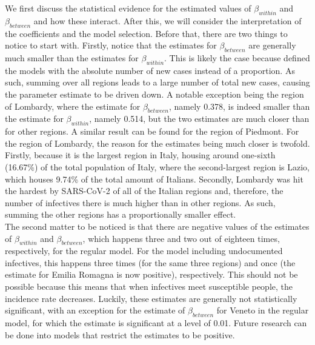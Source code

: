 \documentclass[12pt]{article}
\begin{document}
	We first discuss the statistical evidence for the estimated values of $\beta_{within}$ and $\beta_{between}$ and how these interact. After this, we will consider the interpretation of the coefficients and the model selection. Before that, there are two things to notice to start with. Firstly, notice that the estimates for $\beta_{between}$ are generally much smaller than the estimates for $\beta_{within}$. This is likely the case because \textcite{adda2016economic} defined the models with the absolute number of new cases instead of a proportion. As such, summing over all regions leads to a large number of total new cases, causing the parameter estimate to be driven down. A notable exception being the region of Lombardy, where the estimate for $\beta_{between}$, namely 0.378, is indeed smaller than the estimate for $\beta_{within}$, namely 0.514, but the two estimates are much closer than for other regions. A similar result can be found for the region of Piedmont. For the region of Lombardy, the reason for the estimates being much closer is twofold. Firstly, because it is the largest region in Italy, housing around one-sixth (16.67\%) of the total population of Italy, where the second-largest region is Lazio, which houses 9.74\% of the total amount of Italians. Secondly, Lombardy was hit the hardest by SARS-CoV-2 of all of the Italian regions and, therefore, the number of infectives there is much higher than in other regions. As such, summing the other regions has a proportionally smaller effect. \\
	
	The second matter to be noticed is that there are negative values of the estimates of $\beta_{within}$ and $\beta_{between}$, which happens three and two out of eighteen times, respectively, for the regular model. For the model including undocumented infectives, this happens three times (for the same three regions) and once (the estimate for Emilia Romagna is now positive), respectively. This should not be possible because this means that when infectives meet susceptible people, the incidence rate decreases. Luckily, these estimates are generally not statistically significant, with an exception for the estimate of $\beta_{between}$ for Veneto in the regular model, for which the estimate is significant at a level of 0.01. Future research can be done into models that restrict the estimates to be positive. \\
	
\end{document}
